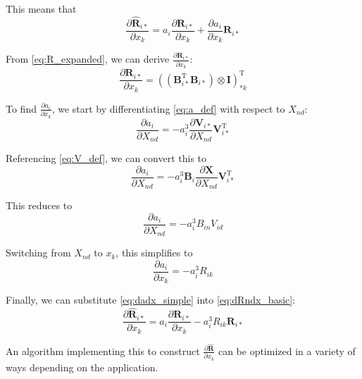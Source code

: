 \documentclass[11pt]{article}
\begin{document}
This means that
\begin{equation} \label{eq:dRndx_basic}
    \frac{\partial \mathbf{\hat{R}}_{i*}}{\partial x_k}
    = a_i \frac{\partial \mathbf{R}_{i*}}{\partial x_k}
    + \frac{\partial a_i}{\partial x_k} \mathbf{R}_{i*}
\end{equation}

From \eqref{eq:R_expanded}, we can derive $\frac{\partial \mathbf{R}_{i*}}{\partial x_k}$:
\begin{equation} \label{eq:dRdx}
    \frac{\partial \mathbf{R}_{i*}}{\partial x_k}
    = ((\mathbf{B}_{i*}^\mathrm{T} \mathbf{B}_{i*}) \otimes \mathbf{I})_{*k}^\mathrm{T}
\end{equation}

To find $\frac{\partial a_i}{\partial x_k}$, we start by differentiating
\eqref{eq:a_def} with respect to $X_{nd}$:
\begin{equation}
    \frac{\partial a_i}{\partial X_{nd}}
    = -a_i^3 \frac{\partial \mathbf{V}_{i*}}{\partial X_{nd}} \mathbf{V}_{i*}^\mathrm{T}
\end{equation}

Referencing \eqref{eq:V_def}, we can convert this to
\begin{equation}
    \frac{\partial a_i}{\partial X_{nd}}
    = -a_i^3 \mathbf{B}_i \frac{\partial \mathbf{X}}{\partial X_{nd}} \mathbf{V}_{i*}^\mathrm{T}
\end{equation}

This reduces to
\begin{equation}
    \frac{\partial a_i}{\partial X_{nd}} = -a_i^3 B_{in} V_{id}
\end{equation}

Switching from $X_{nd}$ to $x_k$, this simplifies to
\begin{equation} \label{eq:dadx_simple}
    \frac{\partial a_i}{\partial x_k} = -a_i^3 R_{ik}
\end{equation}

Finally, we can substitute \eqref{eq:dadx_simple} into \eqref{eq:dRndx_basic}:
\begin{equation}
    \frac{\partial \mathbf{\hat{R}}_{i*}}{\partial x_k}
    = a_i \frac{\partial \mathbf{R}_{i*}}{\partial x_k} - a_i^3 R_{ik} \mathbf{R}_{i*}
\end{equation}

An algorithm implementing this to construct $\frac{\partial \mathbf{\hat{R}}}{\partial x_k}$
can be optimized in a variety of ways depending on the application.
\end{document}
